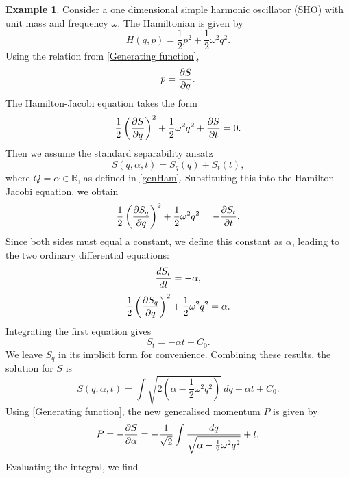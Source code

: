 \documentclass[12pt,oneside]{report}
\theoremstyle{definition}
\newtheorem{example}{Example}
\begin{document}
\begin{example}\label{SHO}
Consider a one dimensional simple harmonic oscillator (SHO) with unit mass and frequency $\omega$. The Hamiltonian is given by
\begin{equation}
H(q,p) = \frac{1}{2} p^{2} + \frac{1}{2} \omega^{2} q^{2}.
\end{equation}
Using the relation from \autoref{Generating function},
\begin{equation}
p = \displaystyle\frac{\partial S}{\partial q}.
\end{equation}
The Hamilton-Jacobi equation takes the form
\begin{equation}
\frac{1}{2} \left(\displaystyle\frac{\partial S}{\partial q}\right)^{2} + \frac{1}{2} \omega^{2} q^{2} + \displaystyle\frac{\partial S}{\partial t} = 0.
\end{equation}
Then we assume the standard separability ansatz 
\begin{equation}
S(q, \alpha, t) = S_q(q) + S_t(t),
\end{equation}
where $Q = \alpha \in \mathbb{R}$, as defined in \autoref{genHam}. Substituting this into the Hamilton-Jacobi equation, we obtain
\begin{equation}
\frac{1}{2} \left(\displaystyle\frac{\partial S_q}{\partial q}\right)^{2} + \frac{1}{2} \omega^{2} q^{2} = -\displaystyle\frac{\partial S_t}{\partial t}.
\end{equation}
Since both sides must equal a constant, we define this constant as $\alpha$, leading to the two ordinary differential equations:
\begin{equation}
\displaystyle\frac{d S_t}{d t} = -\alpha,
\end{equation}
\begin{equation}
\frac{1}{2} \left(\displaystyle\frac{\partial S_q}{\partial q}\right)^{2} + \frac{1}{2} \omega^{2} q^{2} = \alpha.
\end{equation}
Integrating the first equation gives
\begin{equation}
S_t = -\alpha t + C_0.
\end{equation}
We leave $S_q$ in its implicit form for convenience. Combining these results, the solution for $S$ is
\begin{equation}
S(q, \alpha, t) = \int \sqrt{2 \left(\alpha - \frac{1}{2} \omega^{2} q^{2} \right)} \ dq - \alpha t + C_0.
\end{equation}
Using \autoref{Generating function}, the new generalised momentum $P$ is given by
\begin{equation}
P = -\displaystyle\frac{\partial S}{\partial \alpha} = -\frac{1}{\sqrt{2}} \int \frac{dq}{\sqrt{\alpha - \frac{1}{2} \omega^{2} q^{2}}} + t.
\end{equation}
Evaluating the integral, we find

\end{example}
\end{document}
